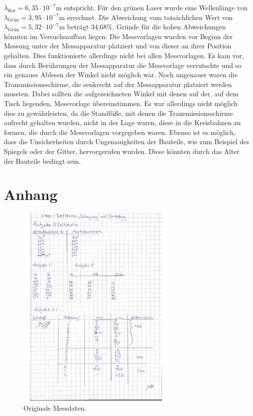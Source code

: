 $\lambda_\text{Rot} = 6,35 \cdot 10^{-7} \si{\meter}$ entspricht. Für den grünen Laser wurde eine Wellenlänge von $\lambda_\text{Grün} = 3,95 \cdot 10^{-7} \si{\meter}$ errechnet.
Die Abweichung vom tatsächlichen Wert von $\lambda_\text{Grün} = 5,32 \cdot 10^{-7} \si{\meter}$ beträgt 34,68\%.
\newline\newline
Gründe für die hohen Abweichungen könnten im Versuchsaufbau liegen. Die Messvorlagen wurden vor Beginn der Messung unter der Messapparatur platziert und von dieser
an ihrer Position gehalten. Dies funktionierte allerdings nicht bei allen Messvorlagen. Es kam vor, dass durch Berührungen der Messapparatur die Messvorlage verrutschte und so
ein genaues Ablesen der Winkel nicht möglich war.
\newline
Noch ungenauer waren die Transmissionsschirme, die senkrecht auf der Messapparatur platziert werden mussten. Dabei sollten die aufgezeichneten Winkel mit denen auf der, auf dem
Tisch liegenden, Messvorlage übereinstimmen. Es war allerdings nicht möglich dies zu gewährleisten, da die Standfüße, mit denen die Transmissionsschirme aufrecht gehalten wurden,
nicht in der Lage waren, diese in die Kreisbahnen zu formen, die durch die Messvorlagen vorgegeben waren.
\newline
Ebenso ist es möglich, dass die Unsicherheiten durch Ungenauigkeiten der Bauteile, wie zum Beispiel des Spiegels oder der Gitter, hervorgerufen wurden. Diese könnten durch das
Alter der Bauteile bedingt sein.

\printbibliography{}

\section*{Anhang}
\label{sec:anhang}

\begin{figure}[H]
  \centering
  \includegraphics[width=0.7\textwidth]{data/origDaten.jpg}
  \caption{Originale Messdaten.}
  \label{fig:origDaten1}
\end{figure}
